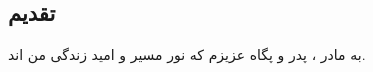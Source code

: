 \titlepageParsi
\cleardoublepage

\clearpage

\begin{center}
    \section*{تقدیم}
    به مادر ، پدر و پگاه عزیزم که نور مسیر و امید زندگی من اند.
\end{center}
\clearpage
